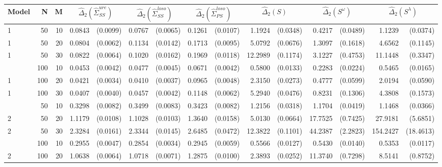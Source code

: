 \begin{table}[ht]
\centering
\begin{small}
\begin{tabular}{lrr|rr|rr|rr|rr|rr|rr}
Model & N & M & \multicolumn{2}{c}{$\hat{\Delta}_2(\hat{\Sigma}^{ure}_{SS})$} &  \multicolumn{2}{c}{$\hat{\Delta}_2(\hat{\Sigma}^{loso}_{SS})$}&  \multicolumn{2}{c}{$\hat{\Delta}_2(\hat{\Sigma}^{loso}_{PS})$} & \multicolumn{2}{c}{$\hat{\Delta}_2(S)$} &  \multicolumn{2}{c}{$\hat{\Delta}_2(S^\omega)$}  &  \multicolumn{2}{c}{$\hat{\Delta}_2(S^\lambda)$}   \\ 
  \hline
1 & 50 & 10 & 0.0843 & (0.0099) & 0.0767 & (0.0065) & 0.1261 & (0.0107) & 1.1924 & (0.0348) & 0.4217 & (0.0489) & 1.1239 & (0.0374) \\ 
  1 & 50 & 20 & 0.0804 & (0.0062) & 0.1134 & (0.0142) & 0.1713 & (0.0095) & 5.0792 & (0.0676) & 1.3097 & (0.1618) & 4.6562 & (0.1145) \\ 
  1 & 50 & 30 & 0.0822 & (0.0064) & 0.1020 & (0.0162) & 0.1969 & (0.0118) & 12.2989 & (0.1174) & 3.1227 & (0.4753) & 11.1448 & (0.3347) \\ 
\hdashline
  1 & 100 & 10 & 0.0453 & (0.0042) & 0.0477 & (0.0045) & 0.0671 & (0.0042) & 0.5800 & (0.0133) & 0.2283 & (0.0224) & 0.5465 & (0.0165) \\ 
  1 & 100 & 20 & 0.0421 & (0.0034) & 0.0410 & (0.0037) & 0.0965 & (0.0048) & 2.3150 & (0.0273) & 0.4777 & (0.0599) & 2.0194 & (0.0590) \\ 
  1 & 100 & 30 & 0.0407 & (0.0040) & 0.0457 & (0.0042) & 0.1148 & (0.0062) & 5.2940 & (0.0476) & 0.8231 & (0.1306) & 4.3808 & (0.1573) \\ 
\hdashline
\hdashline
  2 & 50 & 10 & 0.3298 & (0.0082) & 0.3499 & (0.0083) & 0.3423 & (0.0082) & 1.2156 & (0.0318) & 1.1704 & (0.0419) & 1.1468 & (0.0366) \\ 
  2 & 50 & 20 & 1.1179 & (0.0108) & 1.1028 & (0.0103) & 1.3640 & (0.0158) & 5.0130 & (0.0664) & 17.7525 & (0.7425) & 27.9181 & (5.6851) \\ 
  2 & 50 & 30 & 2.3284 & (0.0161) & 2.3344 & (0.0145) & 2.6485 & (0.0472) & 12.3822 & (0.1101) & 44.2387 & (2.2823) & 154.2427 & (18.4613) \\ 
\hdashline
  2 & 100 & 10 & 0.2955 & (0.0047) & 0.2854 & (0.0034) & 0.2945 & (0.0059) & 0.5566 & (0.0127) & 0.5430 & (0.0140) & 0.5353 & (0.0117) \\ 
  2 & 100 & 20 & 1.0638 & (0.0064) & 1.0718 & (0.0071) & 1.2875 & (0.0100) & 2.3893 & (0.0252) & 11.3740 & (0.7298) & 8.5141 & (0.8752) \\ 

\end{tabular}
\end{small}
\end{table}
